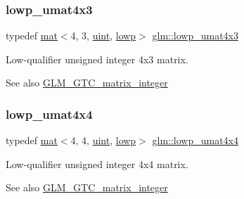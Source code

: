 \subsubsection{\texorpdfstring{lowp\+\_\+umat4x3}{lowp\_umat4x3}}
{\footnotesize\ttfamily typedef \mbox{\hyperlink{structglm_1_1mat}{mat}}$<$4, 3, \mbox{\hyperlink{group__core__precision_ga4fd29415871152bfb5abd588334147c8}{uint}}, \mbox{\hyperlink{namespaceglm_a36ed105b07c7746804d7fdc7cc90ff25ae161af3fc695e696ce3bf69f7332bc2d}{lowp}}$>$ \mbox{\hyperlink{group__gtc__matrix__integer_ga5eb6bfe468dd615e0a78fb9f3ca813c6}{glm\+::lowp\+\_\+umat4x3}}}

Low-\/qualifier unsigned integer 4x3 matrix. \begin{DoxySeeAlso}{See also}
\mbox{\hyperlink{group__gtc__matrix__integer}{G\+L\+M\+\_\+\+G\+T\+C\+\_\+matrix\+\_\+integer}} 
\end{DoxySeeAlso}
\mbox{\label{group__gtc__matrix__integer_ga4386ea62144a0c737b4789ed87df4177}} 
\subsubsection{\texorpdfstring{lowp\+\_\+umat4x4}{lowp\_umat4x4}}
{\footnotesize\ttfamily typedef \mbox{\hyperlink{structglm_1_1mat}{mat}}$<$4, 4, \mbox{\hyperlink{group__core__precision_ga4fd29415871152bfb5abd588334147c8}{uint}}, \mbox{\hyperlink{namespaceglm_a36ed105b07c7746804d7fdc7cc90ff25ae161af3fc695e696ce3bf69f7332bc2d}{lowp}}$>$ \mbox{\hyperlink{group__gtc__matrix__integer_ga4386ea62144a0c737b4789ed87df4177}{glm\+::lowp\+\_\+umat4x4}}}

Low-\/qualifier unsigned integer 4x4 matrix. \begin{DoxySeeAlso}{See also}
\mbox{\hyperlink{group__gtc__matrix__integer}{G\+L\+M\+\_\+\+G\+T\+C\+\_\+matrix\+\_\+integer}} 
\end{DoxySeeAlso}
\mbox{\label{group__gtc__matrix__integer_ga74e065ab9524e6b7bd5a84cffb758e71}} 
